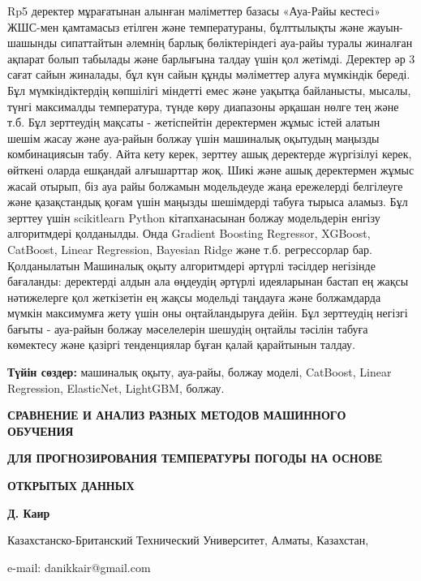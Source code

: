 Rp5 деректер мұрағатынан алынған мәліметтер базасы «Ауа-Райы кестесі»
ЖШС-мен қамтамасыз етілген және температураны, бұлттылықты және
жауын-шашынды сипаттайтын әлемнің барлық бөліктеріндегі ауа-райы туралы
жиналған ақпарат болып табылады және барлығына талдау үшін қол жетімді.
Деректер әр 3 сағат сайын жиналады, бұл күн сайын құнды мәліметтер алуға
мүмкіндік береді. Бұл мүмкіндіктердің көпшілігі міндетті емес және
уақытқа байланысты, мысалы, түнгі максималды температура, түнде көру
диапазоны әрқашан нөлге тең және т.б. Бұл зерттеудің мақсаты -
жетіспейтін деректермен жұмыс істей алатын шешім жасау және ауа-райын
болжау үшін машиналық оқытудың маңызды комбинациясын табу. Айта кету
керек, зерттеу ашық деректерде жүргізілуі керек, өйткені оларда ешқандай
алғышарттар жоқ. Шикі және ашық деректермен жұмыс жасай отырып, біз ауа
райы болжамын модельдеуде жаңа ережелерді белгілеуге және қазақстандық
қоғам үшін маңызды шешімдерді табуға тырыса аламыз. Бұл зерттеу үшін
scikitlearn Python кітапханасынан болжау модельдерін енгізу алгоритмдері
қолданылды. Онда Gradient Boosting Regressor, XGBoost, CatBoost, Linear
Regression, Bayesian Ridge және т.б. регрессорлар бар. Қолданылатын
Машиналық оқыту алгоритмдері әртүрлі тәсілдер негізінде бағаланды:
деректерді алдын ала өңдеудің әртүрлі идеяларынан бастап ең жақсы
нәтижелерге қол жеткізетін ең жақсы модельді таңдауға және болжамдарда
мүмкін максимумға жету үшін оны оңтайландыруға дейін. Бұл зерттеудің
негізгі бағыты - ауа-райын болжау мәселелерін шешудің оңтайлы тәсілін
табуға көмектесу және қазіргі тенденциялар бұған қалай қарайтынын
талдау.

{\bfseries Түйін сөздер:} машиналық оқыту, ауа-райы, болжау моделі,
CatBoost, Linear Regression, ElasticNet, LightGBM, болжау.

{\bfseries СРАВНЕНИЕ И АНАЛИЗ РАЗНЫХ МЕТОДОВ МАШИННОГО ОБУЧЕНИЯ}

{\bfseries ДЛЯ ПРОГНОЗИРОВАНИЯ ТЕМПЕРАТУРЫ ПОГОДЫ НА ОСНОВЕ}

{\bfseries ОТКРЫТЫХ ДАННЫХ}

{\bfseries Д. Каир}

Казахстанско-Британский Технический Университет, Алматы, Казахстан,

e-mail: danikkair@gmail.com

